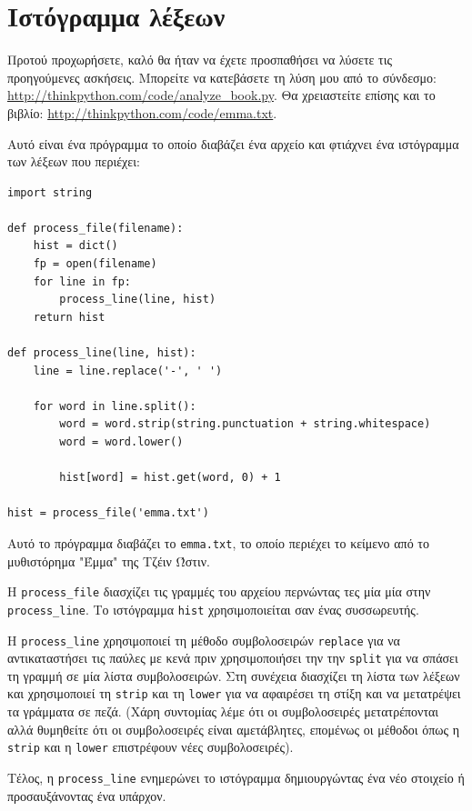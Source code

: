 \documentclass[10pt]{book}
\begin{document}
\section{Ιστόγραμμα λέξεων}

Προτού προχωρήσετε, καλό θα ήταν να έχετε προσπαθήσει να λύσετε τις προηγούμενες ασκήσεις. Μπορείτε να κατεβάσετε τη λύση μου από το σύνδεσμο: \url{http://thinkpython.com/code/analyze_book.py}. Θα χρειαστείτε επίσης και το βιβλίο: \url{http://thinkpython.com/code/emma.txt}.

Αυτό είναι ένα πρόγραμμα το οποίο διαβάζει ένα αρχείο και φτιάχνει ένα ιστόγραμμα των λέξεων που περιέχει:

\begin{verbatim}
import string

def process_file(filename):
    hist = dict()
    fp = open(filename)
    for line in fp:
        process_line(line, hist)
    return hist

def process_line(line, hist):
    line = line.replace('-', ' ')

    for word in line.split():
        word = word.strip(string.punctuation + string.whitespace)
        word = word.lower()

        hist[word] = hist.get(word, 0) + 1

hist = process_file('emma.txt')
\end{verbatim}
%
Αυτό το πρόγραμμα διαβάζει το {\tt emma.txt}, το οποίο περιέχει το κείμενο από το μυθιστόρημα "Έμμα" της Τζέιν Ώστιν.

Η \verb"process_file" διασχίζει τις γραμμές του αρχείου περνώντας τες μία μία στην \verb"process_line". Το ιστόγραμμα {\tt hist} χρησιμοποιείται σαν ένας συσσωρευτής.

Η \verb"process_line" χρησιμοποιεί τη μέθοδο συμβολοσειρών {\tt replace} για να αντικαταστήσει τις παύλες με κενά πριν χρησιμοποιήσει την την {\tt split} για να σπάσει τη γραμμή σε μία λίστα συμβολοσειρών. Στη συνέχεια  διασχίζει τη λίστα των λέξεων και χρησιμοποιεί τη {\tt strip} και τη {\tt lower} για να αφαιρέσει τη στίξη και να μετατρέψει τα γράμματα σε πεζά. (Χάρη συντομίας λέμε ότι οι συμβολοσειρές μετατρέπονται αλλά θυμηθείτε ότι οι συμβολοσειρές είναι αμετάβλητες, επομένως οι μέθοδοι όπως η {\tt strip} και η {\tt lower} επιστρέφουν νέες συμβολοσειρές).

Τέλος, η \verb"process_line" ενημερώνει το ιστόγραμμα δημιουργώντας ένα νέο στοιχείο ή προσαυξάνοντας ένα υπάρχον.
\end{document}
